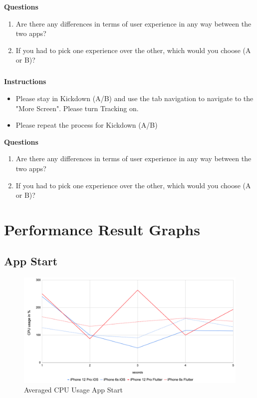 \textbf{Questions}
\begin{enumerate}
    \item Are there any differences in terms of user experience in any way between the two apps?
    \item If you had to pick one experience over the other, which would you choose (A or B)?
\end{enumerate}

\paragraph*{    }\hfill \break
\textbf{Instructions}
\begin{itemize}
    \item Please stay in Kickdown (A/B) and use the tab navigation to navigate to the "More Screen". Please turn Tracking on.
    \item Please repeat the process for Kickdown (A/B)
\end{itemize}

\textbf{Questions}
\begin{enumerate}
    \item Are there any differences in terms of user experience in any way between the two apps?
    \item If you had to pick one experience over the other, which would you choose (A or B)?
\end{enumerate}


\chapter{Performance Result Graphs} \label{section::performance_tracing_results}

\section{App Start}

\begin{figure}[!htbp]
    \centering
    \includegraphics[width=\linewidth]{images/performance_results/app_start/avg_cpu_usage_app_start.png}
    \caption{Averaged CPU Usage App Start}
    \label{fig:avg_cpu_usage_app_start}
\end{figure}

